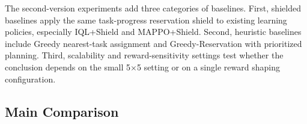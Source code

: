 \documentclass[preprint,12pt]{elsarticle}
\begin{document}
The second-version experiments add three categories of baselines. First, shielded baselines apply the same task-progress reservation shield to existing learning policies, especially IQL+Shield and MAPPO+Shield. Second, heuristic baselines include Greedy nearest-task assignment and Greedy-Reservation with prioritized planning. Third, scalability and reward-sensitivity settings test whether the conclusion depends on the small 5$\times$5 setting or on a single reward shaping configuration.

\subsection{Main Comparison}


\begin{table}[htbp]
\centering
\caption{Main comparison under the default construction scenario. The shielded learning rows show that zero collision can also be obtained by applying the same shield to baselines; therefore, the relevant comparison is the full safety--efficiency--communication profile rather than collision alone.}
\label{tab:main_comparison}
\end{table}
\end{document}
